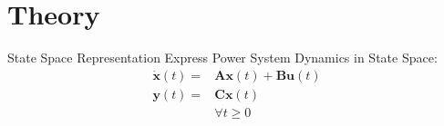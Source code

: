 \section[Theory]{Theory}
\label{sec:lasso_theory}

\begin{frame}[fragile]{State Space Representation}
	Express Power System Dynamics in State Space:
	\begin{equation}
		\label{eq:ssr}
		\begin{align}
			\dot{\textbf{x}}(t) = 
			& \textbf{A}\textbf{x}(t)
			+ \textbf{B}\textbf{u}(t)\\
			\textbf{y}(t) = 
			& \textbf{C}\textbf{x}(t)\\  
			& \forall t\geq0
		\end{align}
	\end{equation}
\end{frame}